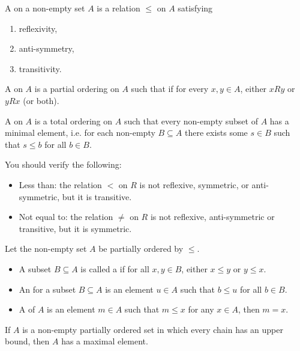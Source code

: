 \begin{definition}
A  on a non-empty set $A$ is a relation $\le$ on $A$ satisfying
\begin{enumerate}[label=(\roman*)]
\item reflexivity,
\item anti-symmetry,
\item transitivity.
\end{enumerate} 

A  on $A$ is a partial ordering on $A$ such that if for every $x, y \in A$, either $xRy$ or $yRx$ (or both).

A  on $A$ is a total ordering on $A$ such that every non-empty subset of $A$ has a minimal element, i.e. for each non-empty $B\subseteq A$ there exists some $s\in B$ such that $s\le b$ for all $b\in B$.
\end{definition}

\begin{example}
You should verify the following:
\begin{itemize}
\item Less than: the relation $<$ on $R$ is not reflexive, symmetric, or anti-symmetric, but it is transitive.
\item Not equal to: the relation $\neq$ on $R$ is not reflexive, anti-symmetric or transitive, but it is symmetric.
\end{itemize}
\end{example}

\begin{definition}
Let the non-empty set $A$ be partially ordered by $\le$.
\begin{itemize}
\item A subset $B\subseteq A$ is called a  if for all $x,y\in B$, either $x\le y$ or $y\le x$.
\item An  for a subset $B\subseteq A$ is an element $u\in A$ such that $b\le u$ for all $b\in B$.
\item A  of $A$ is an element $m\in A$ such that $m\le x$ for any $x\in A$, then $m=x$.
\end{itemize}
\end{definition}

\begin{lemma}
If $A$ is a non-empty partially ordered set in which every chain has an upper bound, then $A$ has a maximal element.
\end{lemma}

